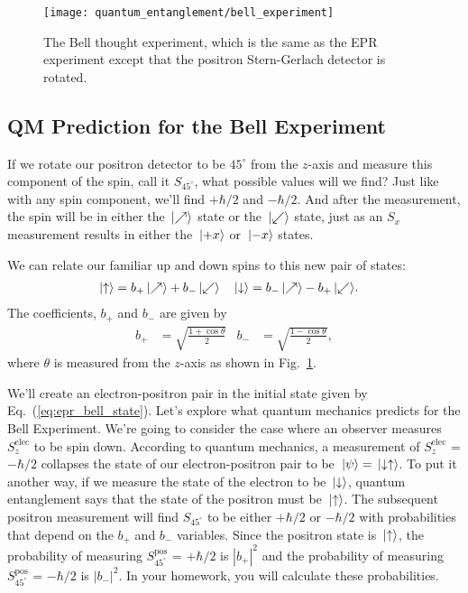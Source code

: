 \begin{figure}[t]
\begin{center}
\texttt{[image: quantum\_entanglement/bell\_experiment]}
\caption{The Bell thought experiment, which is the same as the EPR
experiment except that the positron Stern-Gerlach detector is rotated.}
\label{fig:bell_experiment}
\end{center}
\end{figure}

\subsection{QM Prediction for the Bell Experiment}

If we rotate our positron detector to be $45^\circ$ from the $z$-axis
and measure this component of the spin, call it $S_{45^\circ}$, what
possible values will we find?  Just like with any spin component,
we'll find $+\hbar/2$ and $-\hbar/2$.  And after the measurement, the
spin will be in either the $\,|\mbox{$\nearrow$}\rangle$ state or the
$\,|\mbox{$\swarrow$}\rangle$ state, just as an $S_x$ measurement results in either
the $\,|\mbox{$+x$}\rangle$ or $\,|\mbox{$-x$}\rangle$ states.

We can relate our familiar up and down spins to this new pair of
states:
\begin{align}
 \,|\mbox{$\uparrow$}\rangle &=  b_+\,|\mbox{$\nearrow$}\rangle + b_-\,|\mbox{$\swarrow$}\rangle
  &
 \,|\mbox{$\downarrow$}\rangle &=  b_-\,|\mbox{$\nearrow$}\rangle - b_+\,|\mbox{$\swarrow$}\rangle.
  \label{eq:rotated_basis}
\end{align}
The coefficients, $b_+$ and $b_-$ are given by
\begin{align}
 b_+ &= \sqrt{\frac{1+\cos \theta}{2}}  &
 b_- &= \sqrt{\frac{1-\cos \theta}{2}},  
  \label{eq:b_variables}
\end{align}
where $\theta$ is measured from the $z$-axis as shown in 
Fig.~\ref{fig:bell_experiment}. 

We'll create an electron-positron pair in the initial state given by
Eq.~(\ref{eq:epr_bell_state}).  Let's explore what quantum mechanics
predicts for the Bell Experiment.  We're going to consider the
case where an observer measures $S_z^\text{elec}$ to be spin down.
According to quantum mechanics, a measurement of $S_z^\text{elec}$
= $-\hbar/2$ collapses the state of our electron-positron pair to
be $\,|\mbox{$\psi$}\rangle = \,|\mbox{$\downarrow\uparrow$}\rangle$.  To put it another way,
if we measure the state of the electron to be $\,|\mbox{$\downarrow$}\rangle$,
quantum entanglement says that the state of the positron must be
$\,|\mbox{$\uparrow$}\rangle$.  The subsequent positron measurement will find
$S_{45^\circ}$ to be either $+\hbar/2$ or $-\hbar/2$ with probabilities
that depend on the $b_+$ and $b_-$ variables.  Since the positron state is
$\,|\mbox{$\uparrow$}\rangle$, the probability of measuring $S_{45^\circ}^\text{pos}$
= $+\hbar/2$ is $\left|b_+\right|^2$ and the probability of measuring
$S_{45^\circ}^\text{pos}$  = $-\hbar/2$ is $\left|b_-\right|^2$.  In your
homework, you will calculate these probabilities.

